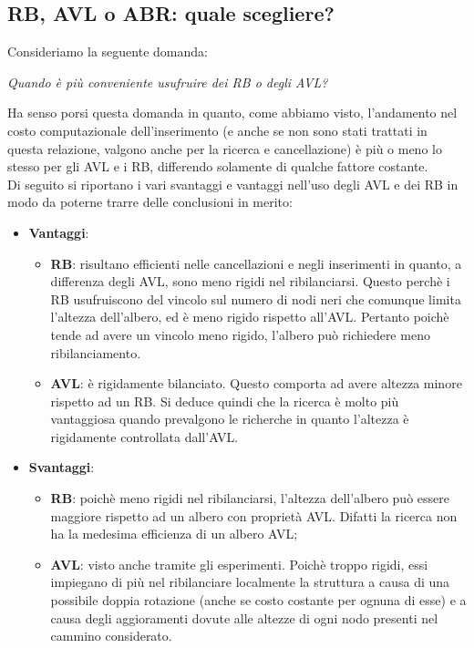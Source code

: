 \subsection{RB, AVL o ABR: quale scegliere?}
\label{Sezione5.2}
Consideriamo la seguente domanda:
\begin{tcolorbox}[colback=lightgray!20,%
	colframe=black,%
	arc=3mm, auto outer arc,]\centering\textit{Quando è più conveniente usufruire dei RB o degli AVL?}
\end{tcolorbox}
Ha senso porsi questa domanda in quanto, come abbiamo visto, l'andamento nel costo computazionale dell'inserimento (e anche se non sono stati trattati in questa relazione, valgono anche per la ricerca e cancellazione) è più o meno lo stesso per gli AVL e i RB, differendo solamente di qualche fattore costante.\\
Di seguito si riportano i vari svantaggi e vantaggi nell'uso degli AVL e dei RB in modo da poterne trarre delle conclusioni in merito:
\begin{itemize}
	\item \textbf{Vantaggi}: 
		\begin{itemize}
			\item \textbf{RB}: risultano efficienti nelle cancellazioni e negli inserimenti in quanto, a differenza degli AVL, sono meno rigidi nel ribilanciarsi. Questo perchè i RB usufruiscono del vincolo sul numero di nodi neri che comunque limita l'altezza dell'albero, ed è meno rigido rispetto all'AVL. Pertanto poichè tende ad avere un vincolo meno rigido, l'albero può richiedere meno ribilanciamento.
			\item \textbf{AVL}: è rigidamente bilanciato. Questo comporta ad avere altezza minore rispetto ad un RB. Si deduce quindi che la ricerca è molto più vantaggiosa quando prevalgono le richerche in quanto l'altezza è rigidamente controllata dall'AVL.
		\end{itemize}
	\item\textbf{Svantaggi}:
			\begin{itemize}
			\item \textbf{RB}: poichè meno rigidi nel ribilanciarsi, l'altezza dell'albero può essere maggiore rispetto ad un albero con proprietà AVL. Difatti la ricerca non ha la medesima efficienza di un albero AVL;
			\item \textbf{AVL}: visto anche tramite gli esperimenti. Poichè troppo rigidi, essi impiegano di più nel ribilanciare localmente la struttura a causa di una possibile doppia rotazione (anche se costo costante per ognuna di esse) e a causa degli aggioramenti dovute alle altezze di ogni nodo presenti nel cammino considerato.
		\end{itemize}
\end{itemize}
